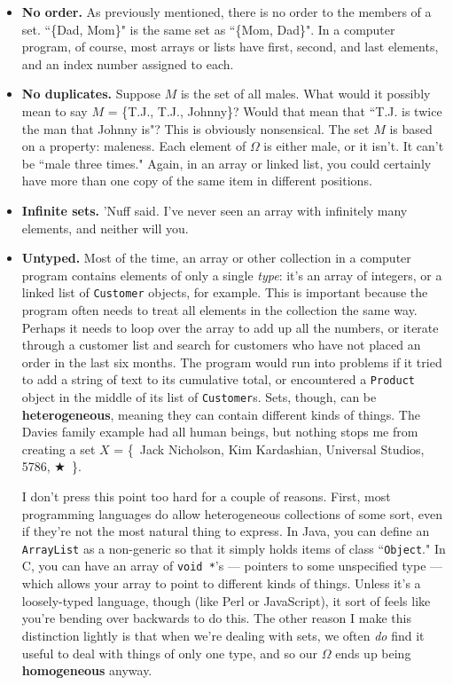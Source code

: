 \begin{itemize}

\item \textbf{No order.}  As previously mentioned,
there is no order to the members of a set. ``\{Dad, Mom\}" is the same
set as ``\{Mom, Dad\}". In a computer program, of course, most arrays
or lists have first, second, and last elements, and an index number
assigned to each.

\item \textbf{No duplicates.}  Suppose $M$ is
the set of all males. What would it possibly mean to say $M$ = \{T.J.,
T.J., Johnny\}?  Would that mean that ``T.J. is twice the man that Johnny
is"? This is obviously nonsensical. The set $M$ is based on a property:
maleness. Each element of $\Omega$ is either male, or it isn't. It can't be
``male three times." Again, in an array or linked list, you could certainly
have more than one copy of the same item in different positions.

\item \textbf{Infinite sets.} 'Nuff said. I've never seen an array with
infinitely many elements, and neither will you. 

\item \textbf{Untyped.}   
Most of the time, an array or other collection in a computer program contains
elements of only a single \textit{type}: it's an array of integers, or a
linked list of \texttt{Customer} objects, for example. This is important
because the program often needs to treat all elements in the collection the
same way. Perhaps it needs to loop over the array to add up all the numbers,
or iterate through a customer list and search for customers who have not
placed an order in the last six months. The program would run into problems if
it tried to add a string of text to its cumulative total, or encountered a
\texttt{Product} object in the middle of its list of \texttt{Customer}s. Sets,
though, can be \textbf{heterogeneous}, meaning they can contain different
kinds of things. The Davies family example had all human beings, but nothing
stops me from creating a set $X$ = \{~Jack Nicholson, Kim Kardashian,
Universal Studios, 5786, $\bigstar$~\}.

I don't press this point too hard for a couple of reasons. First, most
programming languages do allow heterogeneous collections of some sort, even if
they're not the most natural thing to express. In Java, you can define an
\texttt{ArrayList} as a non-generic so that it simply holds items of class
``\texttt{Object}." In C, you can have an array of \texttt{void *}'s ---
pointers to some unspecified type --- which allows your array to point to
different kinds of things. Unless it's a loosely-typed language,
 though (like Perl or JavaScript), it sort of
feels like you're bending over backwards to do this. The other reason I make
this distinction lightly is that when we're dealing with sets, we often
\textit{do} find it useful to deal with things of only one type, and so our
$\Omega$ ends up being \textbf{homogeneous}  anyway.


\end{itemize}
